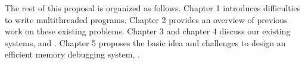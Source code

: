 \begin{itemize}

\end{itemize}

The rest of this proposal is organized as follows. Chapter 1 introduces 
difficulties to write multithreaded programs. 
Chapter 2 provides an overview of previous work on these existing problems. 
Chapter 3 and chapter 4 discuss our existing systems, \sheriff{} and \dthreads{}.
Chapter 5 proposes the basic idea and challenges to design an efficient memory debugging system, \DoubleTake{}. 


